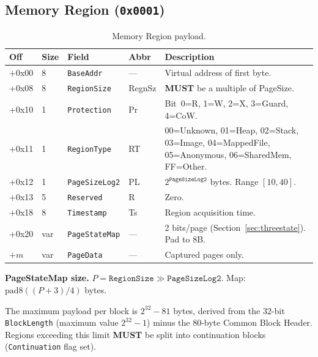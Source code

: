 \documentclass[11pt,a4paper]{article}
\newcommand{\MUST}{\textbf{MUST}}
\newcommand{\hex}[1]{\texttt{0x#1}}
\newcommand{\field}[1]{\texttt{#1}}
\newcommand{\padeight}{\ensuremath{\mathrm{pad8}}}
\begin{document}
\subsection{Memory Region (\hex{0001})}\label{sec:memregion}
\begin{table}[H]\centering\caption{Memory Region payload.}\label{tab:memregion}\small
\begin{tabular}{M M l l p{4cm}}\toprule\textbf{Off}&\textbf{Size}&\textbf{Field}&\textbf{Abbr}&\textbf{Description}\\\midrule
+0x00 & 8 & \field{BaseAddr} & --- & Virtual address of first byte. \\
+0x08 & 8 & \field{RegionSize} & RegnSz & \MUST{} be a multiple of PageSize. \\
+0x10 & 1 & \field{Protection} & Pr & Bit~0=R, 1=W, 2=X, 3=Guard, 4=CoW. \\
+0x11 & 1 & \field{RegionType} & RT & 00=Unknown, 01=Heap, 02=Stack, 03=Image, 04=MappedFile, 05=Anonymous, 06=SharedMem, FF=Other. \\
+0x12 & 1 & \field{PageSizeLog2} & PL & $2^{\field{PageSizeLog2}}$ bytes. Range $[10,40]$. \\
+0x13 & 5 & \field{Reserved} & R & Zero. \\
+0x18 & 8 & \field{Timestamp} & Ts & Region acquisition time. \\
+0x20 & var & \field{PageStateMap} & --- & 2 bits/page (Section~\ref{sec:threestate}). Pad to 8B. \\
$+m$ & var & \field{PageData} & --- & Captured pages only. \\\bottomrule
\end{tabular}\end{table}

\noindent\textbf{PageStateMap size.} $P = \field{RegionSize} \gg \field{PageSizeLog2}$. Map: $\padeight((P{+}3)/4)$ bytes.

\begin{notebox}[title={Maximum region size and continuation blocks}]
The maximum payload per block is $2^{32}-81$ bytes, derived from the 32-bit \field{BlockLength} (maximum value $2^{32}-1$) minus the 80-byte Common Block Header. Regions exceeding this limit \MUST{} be split into continuation blocks (\field{Continuation} flag set).
\end{notebox}
\end{document}

